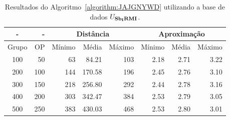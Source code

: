 \begin{table}[!htb]
  \caption{Resultados do Algoritmo~\ref{algorithm:JAJGNYWD} utilizando a base de dados $U_{\textbf{Sb\textsubscript{I}RMI}}{}$.}
  \label{table:XNLAJSQA}
  \centering
  \begin{tabular}{|c|r|r|r|r|r|r|r|}
    \hline
      -      &  -   & \multicolumn{3}{c|}{Distância}             & \multicolumn{3}{c|}{Aproximação}           \\ \hline
    Grupo    & OP   & Mínimo       & Média        & Máximo       & Mínimo       & Média        & Máximo       \\ \hline  
    100      & 50   & 63           &  84.21       & 103          & 2.18         & 2.71         & 3.22         \\ \hline
    200      & 100  & 144          & 170.58       & 196          & 2.45         & 2.76         & 3.10         \\ \hline
    300      & 150  & 218          & 256.80       & 292          & 2.44         & 2.78         & 3.16         \\ \hline
    400      & 200  & 303          & 342.47       & 384          & 2.53         & 2.79         & 3.05         \\ \hline
    500      & 250  & 383          & 430.03       & 468          & 2.53         & 2.80         & 3.01         \\ \hline    
  \end{tabular}
\end{table}